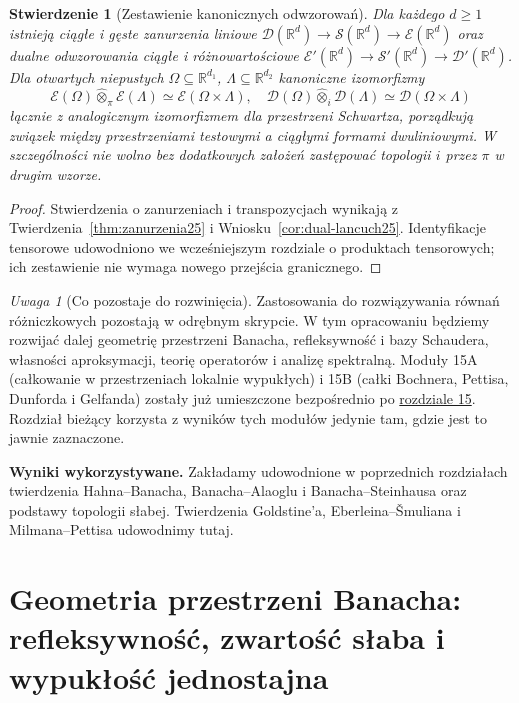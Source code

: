 \documentclass[11pt,a4paper]{article}
\numberwithin{equation}{section}
\theoremstyle{plain}
\newtheorem{stwierdzenie}[twierdzenie]{Stwierdzenie}
\theoremstyle{definition}
\theoremstyle{remark}
\newtheorem{uwaga}[twierdzenie]{Uwaga}
\newcommand{\R}{\mathbb R}
\begin{document}
\begin{stwierdzenie}[Zestawienie kanonicznych odwzorowań]
\label{prop:summary25}
Dla każdego $d\ge1$ istnieją ciągłe i gęste zanurzenia
liniowe $\mathcal D(\R^d)\to\mathcal S(\R^d)\to
\mathcal E(\R^d)$ oraz dualne odwzorowania ciągłe
i różnowartościowe
$\mathcal E'(\R^d)\to\mathcal S'(\R^d)\to
\mathcal D'(\R^d)$. Dla otwartych niepustych
$\Omega\subseteq\R^{d_1}$, $\Lambda\subseteq\R^{d_2}$
kanoniczne izomorfizmy
\[
\mathcal E(\Omega)\widehat\otimes_\pi\mathcal E(\Lambda)
\simeq\mathcal E(\Omega\times\Lambda),\quad
\mathcal D(\Omega)\widehat\otimes_i\mathcal D(\Lambda)
\simeq\mathcal D(\Omega\times\Lambda)
\]
łącznie z analogicznym izomorfizmem dla przestrzeni Schwartza,
porządkują związek między przestrzeniami testowymi a
ciągłymi formami dwuliniowymi. W szczególności nie wolno
bez dodatkowych założeń zastępować topologii $i$ przez $\pi$
w drugim wzorze.
\end{stwierdzenie}
\begin{proof}
Stwierdzenia o zanurzeniach i transpozycjach wynikają z
Twierdzenia~\ref{thm:zanurzenia25} i
Wniosku~\ref{cor:dual-lancuch25}.
Identyfikacje tensorowe udowodniono we wcześniejszym
rozdziale o produktach tensorowych; ich zestawienie
nie wymaga nowego przejścia granicznego.
\end{proof}

\begin{uwaga}[Co pozostaje do rozwinięcia]
\label{rem:future25}
Zastosowania do rozwiązywania równań różniczkowych
pozostają w odrębnym skrypcie. W tym opracowaniu
będziemy rozwijać dalej geometrię przestrzeni Banacha,
refleksywność i bazy Schaudera, własności aproksymacji,
teorię operatorów i analizę spektralną.
Moduły 15A (całkowanie w przestrzeniach lokalnie wypukłych)
i 15B (całki Bochnera, Pettisa, Dunforda i Gelfanda)
zostały już umieszczone bezpośrednio po \hyperref[sec:wyzsze-pochodne15]{rozdziale 15}.
Rozdział bieżący korzysta z wyników tych modułów jedynie
tam, gdzie jest to jawnie zaznaczone.
\end{uwaga}


\setcounter{section}{25}
\noindent\textbf{Wyniki wykorzystywane.} Zakładamy udowodnione
w poprzednich rozdziałach twierdzenia Hahna--Banacha,
Banacha--Alaoglu i Banacha--Steinhausa oraz podstawy topologii słabej.
Twierdzenia Goldstine'a, Eberleina--\v Smuliana i Milmana--Pettisa
udowodnimy tutaj.
\par\medskip
\section{Geometria przestrzeni Banacha: refleksywność, zwartość słaba i wypukłość jednostajna}
\label{sec:geometria26}
\end{document}

